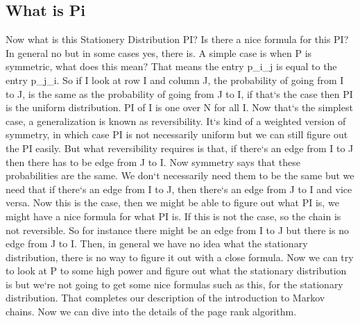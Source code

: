 \subsection{What is Pi}
Now what is this Stationery Distribution PI? Is there a nice formula for this PI? In general no but in some cases yes, there is.
A simple case is when P is symmetric, what does this mean? That means the entry p\_i\_j is equal to the entry p\_j\_i.
So if I look at row I and column J, the probability of going from I to J, is the same as the probability of going from J to I, if that`s the case then PI is the uniform distribution.
PI of I is one over N for all I\@.
Now that`s the simplest case, a generalization is known as reversibility.
It`s kind of a weighted version of symmetry, in which case PI is not necessarily uniform but we can still figure out the PI easily.
But what reversibility requires is that, if there`s an edge from I to J then there has to be edge from J to I\@.
Now symmetry says that these probabilities are the same.
We don`t necessarily need them to be the same but we need that if there`s an edge from I to J, then there`s an edge from J to I and vice versa.
Now this is the case, then we might be able to figure out what PI is, we might have a nice formula for what PI is.
If this is not the case, so the chain is not reversible.
So for instance there might be an edge from I to J but there is no edge from J to I\@.
Then, in general we have no idea what the stationary distribution, there is no way to figure it out with a close formula.
Now we can try to look at P to some high power and figure out what the stationary distribution is but we`re not going to get some nice formulas such as this, for the stationary distribution.
That completes our description of the introduction to Markov chains.
Now we can dive into the details of the page rank algorithm.

